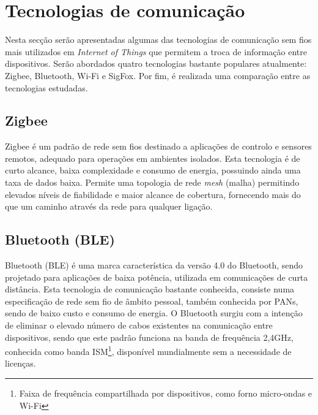 \section{Tecnologias de comunicação}
\label{state-tecc}
Nesta secção serão apresentadas algumas das tecnologias de comunicação sem fios mais utilizados em \textit{Internet of Things} que permitem a troca de informação entre dispositivos. Serão abordados quatro tecnologias bastante populares atualmente: Zigbee, Bluetooth, Wi-Fi e SigFox. Por fim, é realizada uma comparação entre as tecnologias estudadas. 



\subsection{Zigbee}


Zigbee é um padrão de rede sem fios destinado a aplicações de controlo e sensores remotos, adequado para operações em ambientes isolados. Esta tecnologia é de curto alcance, baixa complexidade e consumo de energia, possuindo ainda uma taxa de dados baixa. Permite uma topologia de rede \textit{mesh} (malha) permitindo elevados níveis de fiabilidade e maior alcance de cobertura, fornecendo mais do que um caminho através da rede para qualquer ligação\cite{Rahman2015}. 	




\subsection{Bluetooth (BLE)}


Bluetooth (BLE) é uma marca característica da versão 4.0 do Bluetooth, sendo projetado para aplicações de baixa potência, utilizada em comunicações de curta distância. Esta tecnologia de comunicação bastante conhecida, consiste numa especificação de rede sem fio de âmbito pessoal, também conhecida por \ac{PANs}, sendo de baixo custo e consumo de energia. O Bluetooth surgiu com a intenção de eliminar o elevado número de cabos existentes na comunicação entre dispositivos, sendo que este padrão funciona na banda de frequência 2,4GHz, conhecida como banda \ac{ISM}\footnote{Faixa de frequência compartilhada por dispositivos, como forno micro-ondas e Wi-Fi}, disponível mundialmente sem a necessidade de licenças\cite{Bruno2002}\cite{BluetoothTM2001}. 






